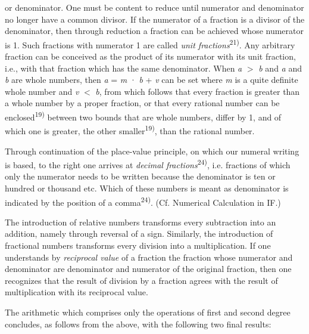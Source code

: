 \thispagestyle{fancy}

\vspace{0.5cm}

or denominator. One must be content to reduce until numerator and denominator no longer have a common divisor. If the numerator of a fraction is a divisor of the denominator, then through reduction a fraction can be achieved whose numerator is 1. Such fractions with numerator 1 are called \textit{unit fractions}\textsuperscript{21)}. Any arbitrary fraction can be conceived as the product of its numerator with its unit fraction, i.e., with that fraction which has the same denominator. When \textit{a} $>$ \textit{b} and \textit{a} and \textit{b} are whole numbers, then \textit{a} = \textit{m} · \textit{b} + \textit{v} can be set where \textit{m} is a quite definite whole number and \textit{v} $<$ \textit{b}, from which follows that every fraction is greater than a whole number by a proper fraction, or that every rational number can be enclosed\textsuperscript{19)} between two bounds that are whole numbers, differ by 1, and of which one is greater, the other smaller\textsuperscript{19)}, than the rational number.

Through continuation of the place-value principle, on which our numeral writing is based, to the right one arrives at \textit{decimal fractions}\textsuperscript{24)}, i.e. fractions of which only the numerator needs to be written because the denominator is ten or hundred or thousand etc. Which of these numbers is meant as denominator is indicated by the position of a comma\textsuperscript{24)}. (Cf. Numerical Calculation in IF.)

The introduction of relative numbers transforms every subtraction into an addition, namely through reversal of a sign. Similarly, the introduction of fractional numbers transforms every division into a multiplication. If one understands by \textit{reciprocal value} of a fraction the fraction whose numerator and denominator are denominator and numerator of the original fraction, then one recognizes that the result of division by a fraction agrees with the result of multiplication with its reciprocal value.

The arithmetic which comprises only the operations of first and second degree concludes, as follows from the above, with the following two final results:


